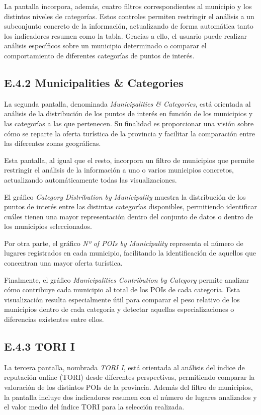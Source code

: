 La pantalla incorpora, además, cuatro filtros correspondientes al municipio y los distintos niveles de categorías. Estos controles permiten restringir el análisis a un subconjunto concreto de la información, actualizando de forma automática tanto los indicadores resumen como la tabla. Gracias a ello, el usuario puede realizar análisis específicos sobre un municipio determinado o comparar el comportamiento de diferentes categorías de puntos de interés.



\subsection{E.4.2 Municipalities \& Categories}
La segunda pantalla, denominada \textit{Municipalities \& Categories}, está orientada al análisis de la distribución de los puntos de interés en función de los municipios y las categorías a las que pertenecen. Su finalidad es proporcionar una visión sobre cómo se reparte la oferta turística de la provincia y facilitar la comparación entre las diferentes zonas geográficas.

Esta pantalla, al igual que el resto, incorpora un filtro de municipios que permite restringir el análisis de la información a uno o varios municipios concretos, actualizando automáticamente todas las visualizaciones.

El gráfico \textit{Category Distribution by Municipality} muestra la distribución de los puntos de interés entre las distintas categorías disponibles, permitiendo identificar cuáles tienen una mayor representación dentro del conjunto de datos o dentro de los municipios seleccionados.

Por otra parte, el gráfico \textit{Nº of POIs by Municipality} representa el número de lugares registrados en cada municipio, facilitando la identificación de aquellos que concentran una mayor oferta turística.

Finalmente, el gráfico \textit{Municipalities Contribution by Category} permite analizar cómo contribuye cada municipio al total de los POIs de cada categoría. Esta visualización resulta especialmente útil para comparar el peso relativo de los municipios dentro de cada categoría y detectar aquellas especializaciones o diferencias existentes entre ellos.


\subsection{E.4.3 TORI I}
La tercera pantalla, nombrada \textit{TORI I}, está orientada al análisis del índice de reputación online (TORI) desde diferentes perspectivas, permitiendo comparar la valoración de los distintos POIs de la provincia. Además del filtro de municipios, la pantalla incluye dos indicadores resumen con el número de lugares analizados y el valor medio del índice TORI para la selección realizada.

